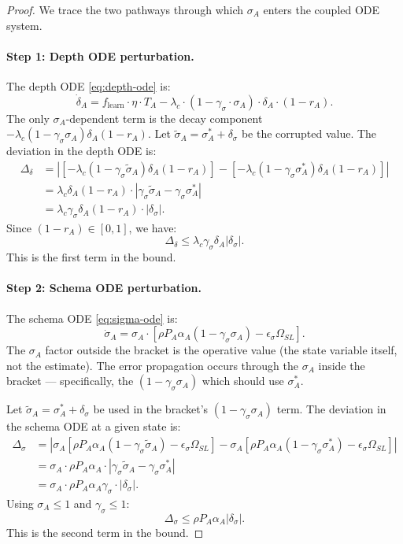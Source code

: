 \begin{proof}
We trace the two pathways through which $\sigma_A$ enters the
coupled ODE system.

\paragraph{Step 1: Depth ODE perturbation.}
The depth ODE \eqref{eq:depth-ode} is:
\[
\dot{\delta}_A = f_{\text{learn}} \cdot \eta \cdot T_A
- \lambda_c \cdot (1 - \gamma_\sigma \cdot \sigma_A) \cdot \delta_A \cdot (1 - r_A).
\]
The only $\sigma_A$-dependent term is the decay component
$-\lambda_c (1 - \gamma_\sigma \sigma_A) \delta_A (1 - r_A)$. Let
$\tilde{\sigma}_A = \sigma_A^* + \delta_\sigma$ be the corrupted value.
The deviation in the depth ODE is:
\begin{align*}
\Delta_{\delta} &= |
[-\lambda_c (1 - \gamma_\sigma \tilde{\sigma}_A) \delta_A (1 - r_A)]
- [-\lambda_c (1 - \gamma_\sigma \sigma_A^*) \delta_A (1 - r_A)] | \\
&= \lambda_c \delta_A (1 - r_A) \cdot |\gamma_\sigma \tilde{\sigma}_A - \gamma_\sigma \sigma_A^*| \\
&= \lambda_c \gamma_\sigma \delta_A (1 - r_A) \cdot |\delta_\sigma|.
\end{align*}
Since $(1 - r_A) \in [0, 1]$, we have:
\[
\Delta_{\delta} \leq \lambda_c \gamma_\sigma \delta_A |\delta_\sigma|.
\]
This is the first term in the bound.

\paragraph{Step 2: Schema ODE perturbation.}
The schema ODE \eqref{eq:sigma-ode} is:
\[
\dot{\sigma}_A = \sigma_A \cdot
[\rho P_A \alpha_A (1 - \gamma_\sigma \sigma_A) - \epsilon_\sigma \Omega_{SL}].
\]
The $\sigma_A$ factor outside the bracket is the operative value
(the state variable itself, not the estimate). The error propagation
occurs through the $\sigma_A$ inside the bracket — specifically, the
$(1 - \gamma_\sigma \sigma_A)$ which should use $\sigma_A^*$.

Let $\tilde{\sigma}_A = \sigma_A^* + \delta_\sigma$ be used in the
bracket's $(1 - \gamma_\sigma \sigma_A)$ term. The deviation in the
schema ODE at a given state is:
\begin{align*}
\Delta_{\sigma} &= |
\sigma_A [\rho P_A \alpha_A (1 - \gamma_\sigma \tilde{\sigma}_A) - \epsilon_\sigma \Omega_{SL}]
- \sigma_A [\rho P_A \alpha_A (1 - \gamma_\sigma \sigma_A^*) - \epsilon_\sigma \Omega_{SL}] | \\
&= \sigma_A \cdot \rho P_A \alpha_A \cdot |\gamma_\sigma \tilde{\sigma}_A - \gamma_\sigma \sigma_A^*| \\
&= \sigma_A \cdot \rho P_A \alpha_A \gamma_\sigma \cdot |\delta_\sigma|.
\end{align*}
Using $\sigma_A \leq 1$ and $\gamma_\sigma \leq 1$:
\[
\Delta_{\sigma} \leq \rho P_A \alpha_A |\delta_\sigma|.
\]
This is the second term in the bound.


\end{proof}
